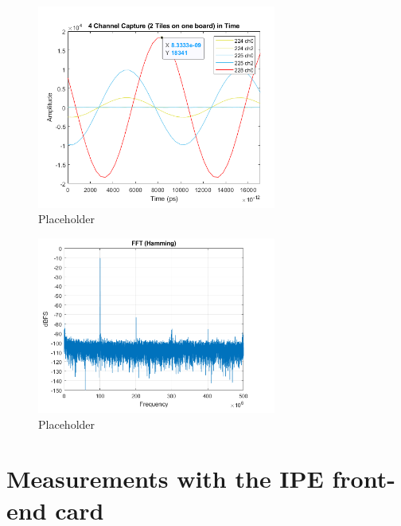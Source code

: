 \begin{figure}[H]
	\centering
	\includegraphics[width = 0.7\textwidth]{chap/04-characterization/img/plot1.png}
	\caption{Placeholder}
	\label{fig:plot1}
\end{figure}
\begin{figure}[H]
	\centering
	\includegraphics[width = 0.7\textwidth]{chap/04-characterization/img/plot2.png}
	\caption{Placeholder}
	\label{fig:plot2}
\end{figure}
\section{Measurements with the IPE front-end card}

\newpage
